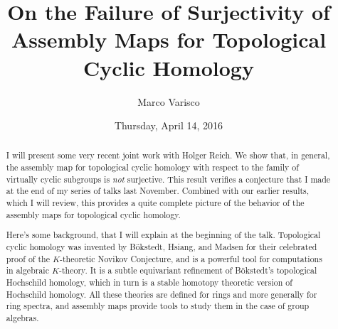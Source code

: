 \documentclass{UAmathtalk}
\author{Marco Varisco}
\title{On the Failure of Surjectivity of Assembly Maps for Topological Cyclic Homology}
\date{Thursday, April 14, 2016}
\begin{document}
\maketitle

\begin{abstract}
I will present some very recent joint work with Holger Reich.
We show that, in general, the assembly map for topological cyclic homology with respect to the family of virtually cyclic subgroups is \emph{not} surjective.
This result verifies a conjecture that I made at the end of my series of talks last November.
Combined with our earlier results, which I will review, this provides a quite complete picture of the behavior of the assembly maps for topological cyclic homology.

Here’s some background, that I will explain at the beginning of the talk.
Topological cyclic homology was invented by Bökstedt, Hsiang, and Madsen for their celebrated proof of the $K$-theoretic Novikov Conjecture, and is a powerful tool for computations in algebraic $K$-theory.
It is a subtle equivariant refinement of Bökstedt’s topological Hochschild homology, which in turn is a stable homotopy theoretic version of Hochschild homology.
All these theories are defined for rings and more generally for ring spectra, and
assembly maps provide tools to study them in the case of group algebras.
\end{abstract}
\end{document}
